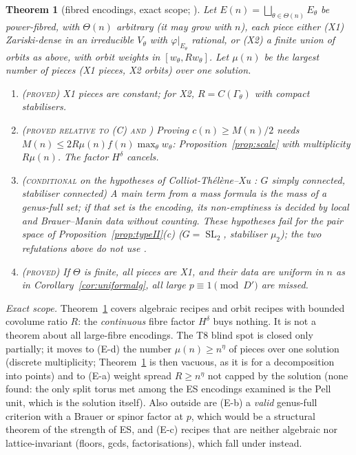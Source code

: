 \documentclass[10pt,reqno]{amsart}
\newtheorem{theorem}{Theorem}[section]
\theoremstyle{definition}
\numberwithin{equation}{section}
\DeclareMathOperator{\SL}{SL}
\newcommand{\status}[1]{\textup{\textsc{#1}}}
\begin{document}
\begin{theorem}[fibred encodings, exact scope; {\cite[Thm.~5.4]{LF}}]\label{thm:fibred}
Let $E(n)=\bigsqcup_{\theta\in\Theta(n)}E_\theta$ be power-fibred, with $\Theta(n)$
arbitrary (it may grow with $n$), each piece either \textup{(X1)}
Zariski-dense in an irreducible $V_\theta$ with $\varphi|_{E_\theta}$ rational,
or \textup{(X2)} a finite union of orbits as above, with orbit weights in
$[w_\theta,Rw_\theta]$. Let $\mu(n)$ be the largest number of pieces (X1
pieces, X2 orbits) over one solution.
\begin{enumerate}
\item \status{(proved)} X1 pieces are constant; for X2,
$R=C(\Gamma_\theta)$ with compact stabilisers.
\item \status{(proved relative to (C) and \cite[Thm.~1.1]{ET})} Proving
$c(n)\ge M(n)/2$ needs $M(n)\le2R\mu(n)f(n)\max_\theta w_\theta$: Proposition~\ref{prop:scale}
with multiplicity $R\mu(n)$. The factor $H^\delta$ cancels.
\item \status{(conditional} on the hypotheses of Colliot-Th\'el\`ene--Xu
\cite[Thm.~3.7]{CTX}: $G$ simply connected, stabiliser connected\status{)} A
main term from a mass formula is the mass of a genus-full set; if that set
is the encoding, its non-emptiness is decided by local and Brauer--Manin
data without counting. These hypotheses fail for the pair space of
Proposition~\ref{prop:typeII}(c) ($G=\SL_2$, stabiliser $\mu_2$); the two
refutations above do not use \cite{CTX}.
\item \status{(proved)} If $\Theta$ is finite, all pieces are X1, and their data are uniform in
$n$ as in Corollary~\ref{cor:uniformalg}, all large $p\equiv1\pmod{D'}$ are
missed.
\end{enumerate}
\end{theorem}
\emph{Exact scope.} Theorem~\ref{thm:fibred} covers algebraic recipes and
orbit recipes with bounded covolume ratio $R$: the \emph{continuous} fibre
factor $H^\delta$ buys nothing. It is not a theorem about all large-fibre
encodings. The T8 blind spot is closed only partially; it moves to
(E-d) the number $\mu(n)\ge n^\eta$ of pieces over one solution (discrete
multiplicity; Theorem~\ref{thm:fibred} is then vacuous, as it is for a
decomposition into points) and to
(E-a) weight spread $R\ge n^\eta$ not capped by the solution (none found:
the only split torus met among the ES encodings examined is the Pell unit,
which is the solution itself). Also outside are (E-b) a \emph{valid} genus-full
criterion with a Brauer or spinor factor at $p$, which would be a
structural theorem of the strength of ES, and (E-c) recipes that are
neither algebraic nor lattice-invariant (floors, gcds, factorisations),
which fall under \cite[Thm.~M]{PS} instead.
\end{document}

